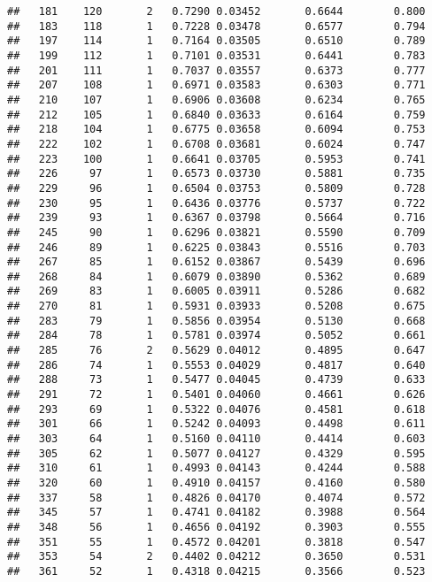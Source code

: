 \documentclass[]{book}
\theoremstyle{definition}
\theoremstyle{definition}
\theoremstyle{definition}
\theoremstyle{remark}
\begin{document}
\begin{verbatim}
##   181    120       2   0.7290 0.03452       0.6644        0.800
##   183    118       1   0.7228 0.03478       0.6577        0.794
##   197    114       1   0.7164 0.03505       0.6510        0.789
##   199    112       1   0.7101 0.03531       0.6441        0.783
##   201    111       1   0.7037 0.03557       0.6373        0.777
##   207    108       1   0.6971 0.03583       0.6303        0.771
##   210    107       1   0.6906 0.03608       0.6234        0.765
##   212    105       1   0.6840 0.03633       0.6164        0.759
##   218    104       1   0.6775 0.03658       0.6094        0.753
##   222    102       1   0.6708 0.03681       0.6024        0.747
##   223    100       1   0.6641 0.03705       0.5953        0.741
##   226     97       1   0.6573 0.03730       0.5881        0.735
##   229     96       1   0.6504 0.03753       0.5809        0.728
##   230     95       1   0.6436 0.03776       0.5737        0.722
##   239     93       1   0.6367 0.03798       0.5664        0.716
##   245     90       1   0.6296 0.03821       0.5590        0.709
##   246     89       1   0.6225 0.03843       0.5516        0.703
##   267     85       1   0.6152 0.03867       0.5439        0.696
##   268     84       1   0.6079 0.03890       0.5362        0.689
##   269     83       1   0.6005 0.03911       0.5286        0.682
##   270     81       1   0.5931 0.03933       0.5208        0.675
##   283     79       1   0.5856 0.03954       0.5130        0.668
##   284     78       1   0.5781 0.03974       0.5052        0.661
##   285     76       2   0.5629 0.04012       0.4895        0.647
##   286     74       1   0.5553 0.04029       0.4817        0.640
##   288     73       1   0.5477 0.04045       0.4739        0.633
##   291     72       1   0.5401 0.04060       0.4661        0.626
##   293     69       1   0.5322 0.04076       0.4581        0.618
##   301     66       1   0.5242 0.04093       0.4498        0.611
##   303     64       1   0.5160 0.04110       0.4414        0.603
##   305     62       1   0.5077 0.04127       0.4329        0.595
##   310     61       1   0.4993 0.04143       0.4244        0.588
##   320     60       1   0.4910 0.04157       0.4160        0.580
##   337     58       1   0.4826 0.04170       0.4074        0.572
##   345     57       1   0.4741 0.04182       0.3988        0.564
##   348     56       1   0.4656 0.04192       0.3903        0.555
##   351     55       1   0.4572 0.04201       0.3818        0.547
##   353     54       2   0.4402 0.04212       0.3650        0.531
##   361     52       1   0.4318 0.04215       0.3566        0.523

\end{verbatim}
\end{document}
